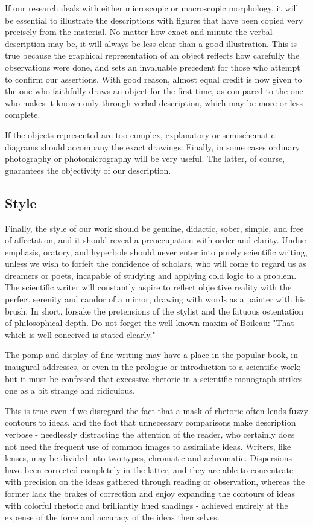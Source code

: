 \documentclass{article}
\begin{document}
If our research deals with either microscopic or macroscopic morphology, it will be essential to illustrate the descriptions with figures that have been copied very precisely from the material. No matter how exact and minute the verbal description may be, it will always be less clear than a good illustration. This is true because the graphical representation of an object reflects how carefully the observations were done, and sets an invaluable precedent for those who attempt to confirm our assertions. With good reason, almost equal credit is now given to the one who faithfully draws an object for the first time, as compared to the one who makes it known only through verbal description, which may be more or less complete.

If the objects represented are too complex, explanatory or semischematic diagrams should accompany the exact drawings. Finally, in some cases ordinary photography or photomicrography will be very useful. The latter, of course, guarantees the objectivity of our description.

\subsection*{Style}

Finally, the style of our work should be genuine, didactic, sober, simple, and free of affectation, and it should reveal a preoccupation with order and clarity. Undue emphasis, oratory, and hyperbole should never enter into purely scientific writing, unless we wish to forfeit the confidence of scholars, who will come to regard us as dreamers or poets, incapable of studying and applying cold logic to a problem. The scientific writer will constantly aspire to reflect objective reality with the perfect serenity and candor of a mirror, drawing with words as a painter with his brush. In short, forsake the pretensions of the stylist and the fatuous ostentation of philosophical depth. Do not forget the well-known maxim of Boileau: "That which is well conceived is stated clearly."

The pomp and display of fine writing may have a place in the popular book, in inaugural addresses, or even in the prologue or introduction to a scientific work; but it must be confessed that excessive rhetoric in a scientific monograph strikes one as a bit strange and ridiculous.

This is true even if we disregard the fact that a mask of rhetoric often lends fuzzy contours to ideas, and the fact that unnecessary comparisons make description verbose - needlessly distracting the attention of the reader, who certainly does not need the frequent use of common images to assimilate ideas. Writers, like lenses, may be divided into two types, chromatic and achromatic. Dispersions have been corrected completely in the latter, and they are able to concentrate with precision on the ideas gathered through reading or observation, whereas the former lack the brakes of correction and enjoy expanding the contours of ideas with colorful rhetoric and brilliantly hued shadings - achieved entirely at the expense of the force and accuracy of the ideas themselves.
\end{document}

